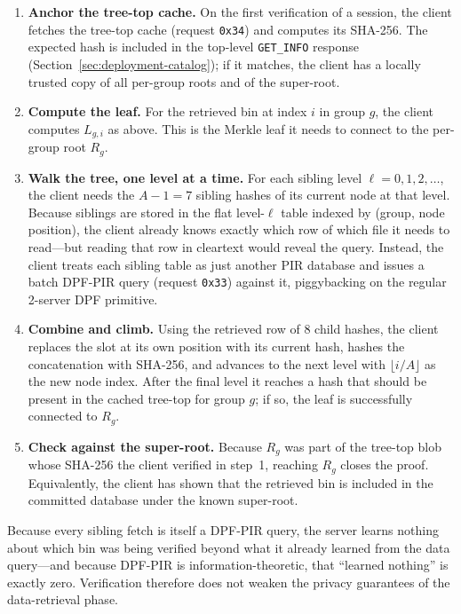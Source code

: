 \begin{enumerate}[nolistsep,leftmargin=*]
    \item \textbf{Anchor the tree-top cache.} On the first verification of a session, the client fetches the tree-top cache (request \texttt{0x34}) and computes its SHA-256. The expected hash is included in the top-level \texttt{GET\_INFO} response (Section~\ref{sec:deployment-catalog}); if it matches, the client has a locally trusted copy of all per-group roots and of the super-root.

    \item \textbf{Compute the leaf.} For the retrieved bin at index $i$ in group $g$, the client computes $L_{g,i}$ as above. This is the Merkle leaf it needs to connect to the per-group root $R_g$.

    \item \textbf{Walk the tree, one level at a time.} For each sibling level $\ell = 0, 1, 2, \ldots$, the client needs the $A - 1 = 7$ sibling hashes of its current node at that level. Because siblings are stored in the flat level-$\ell$ table indexed by (group, node position), the client already knows exactly which row of which file it needs to read---but reading that row in cleartext would reveal the query. Instead, the client treats each sibling table as just another PIR database and issues a batch DPF-PIR query (request \texttt{0x33}) against it, piggybacking on the regular 2-server DPF primitive.

    \item \textbf{Combine and climb.} Using the retrieved row of 8 child hashes, the client replaces the slot at its own position with its current hash, hashes the concatenation with SHA-256, and advances to the next level with $\lfloor i / A \rfloor$ as the new node index. After the final level it reaches a hash that should be present in the cached tree-top for group $g$; if so, the leaf is successfully connected to $R_g$.

    \item \textbf{Check against the super-root.} Because $R_g$ was part of the tree-top blob whose SHA-256 the client verified in step~1, reaching $R_g$ closes the proof. Equivalently, the client has shown that the retrieved bin is included in the committed database under the known super-root.
\end{enumerate}

Because every sibling fetch is itself a DPF-PIR query, the server learns nothing about which bin was being verified beyond what it already learned from the data query---and because DPF-PIR is information-theoretic, that ``learned nothing'' is exactly zero. Verification therefore does not weaken the privacy guarantees of the data-retrieval phase.

